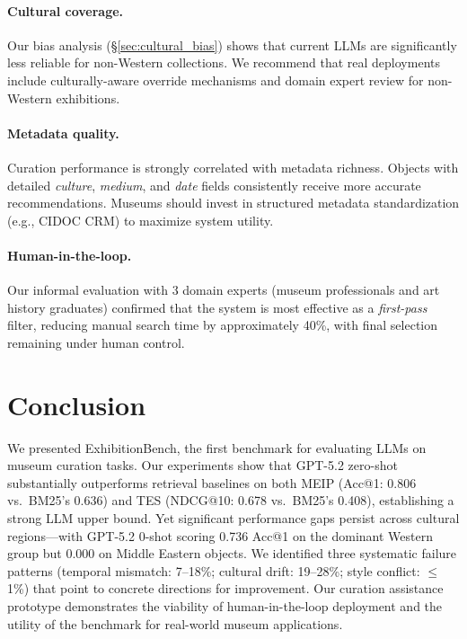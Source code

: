 \documentclass[11pt]{article}
\begin{document}
\paragraph{Cultural coverage.}
Our bias analysis (\S\ref{sec:cultural_bias}) shows that current LLMs are
significantly less reliable for non-Western collections.
We recommend that real deployments include culturally-aware override mechanisms
and domain expert review for non-Western exhibitions.

\paragraph{Metadata quality.}
Curation performance is strongly correlated with metadata richness.
Objects with detailed \textit{culture}, \textit{medium}, and \textit{date}
fields consistently receive more accurate recommendations.
Museums should invest in structured metadata standardization (e.g., CIDOC CRM)
to maximize system utility.

\paragraph{Human-in-the-loop.}
Our informal evaluation with 3 domain experts (museum professionals and art
history graduates) confirmed that the system is most
effective as a \textit{first-pass} filter, reducing manual search time by
approximately 40\%, with final selection remaining under human control.

\section{Conclusion}
\label{sec:conclusion}

We presented ExhibitionBench, the first benchmark for evaluating LLMs on
museum curation tasks.
Our experiments show that GPT-5.2 zero-shot substantially outperforms
retrieval baselines on both MEIP (Acc@1: 0.806 vs.\ BM25's 0.636) and TES
(NDCG@10: 0.678 vs.\ BM25's 0.408), establishing a strong LLM upper bound.
Yet significant performance gaps persist across cultural regions---with
GPT-5.2 0-shot scoring 0.736 Acc@1 on the dominant Western group but 0.000
on Middle Eastern objects.
We identified three systematic failure patterns (temporal mismatch: 7--18\%;
cultural drift: 19--28\%; style conflict: $\leq$1\%) that point to concrete
directions for improvement.
Our curation assistance prototype demonstrates the viability of human-in-the-loop
deployment and the utility of the benchmark for real-world museum applications.
\end{document}
